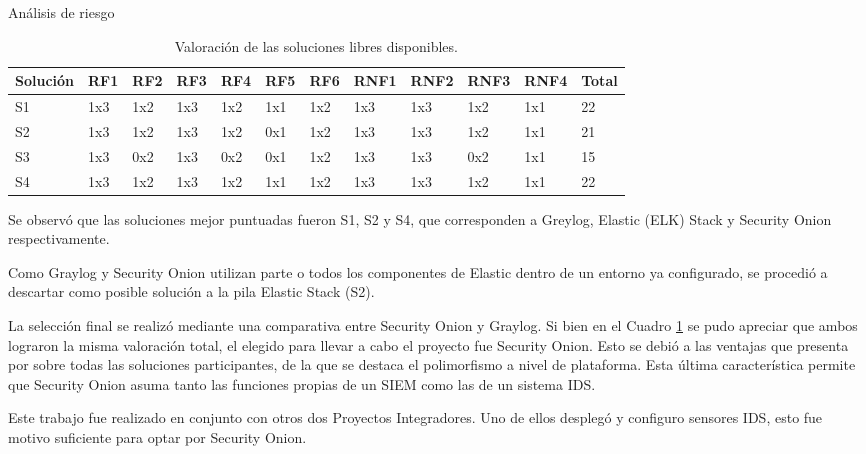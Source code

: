 \begin{section}{Análisis de riesgo}
\begin{table}[H]
\begin{tabular}{|m{4em}|m{2em}|m{2em}|m{2em}|m{2em}|m{2em}|m{2em}|m{3em}|m{3em}|m{3em}|m{3em}| m{2em}|}
            \hline 
                Solución & RF1& RF2& RF3& RF4& RF5& RF6& RNF1& RNF2& RNF3& RNF4 & Total\\ 
            \hline
                S1 & 1x3 & 1x2 & 1x3 & 1x2 & 1x1 & 1x2 & 1x3 & 1x3 & 1x2 & 1x1 & 22\\ 
            \hline
                S2  & 1x3 & 1x2 & 1x3 & 1x2 & 0x1 & 1x2 & 1x3 & 1x3 & 1x2 & 1x1 & 21   \\ 
            \hline
                S3 & 1x3 & 0x2 & 1x3 & 0x2 & 0x1 & 1x2 & 1x3 & 1x3 & 0x2 & 1x1 & 15  \\
            \hline
                S4 & 1x3 & 1x2 & 1x3 & 1x2 & 1x1 & 1x2 & 1x3 & 1x3 & 1x2 & 1x1 & 22 \\
            \hline %
        \end{tabular}
        \caption{Valoración de las soluciones libres disponibles.}
        \label{table:11}
    \end{table} 
    \FloatBarrier
    Se observó que las soluciones mejor puntuadas fueron S1, S2 y S4, que corresponden a Greylog, Elastic (ELK) Stack y Security Onion respectivamente. \par
    Como Graylog y Security Onion utilizan parte o todos los componentes de Elastic dentro de un entorno ya configurado, se procedió a descartar como posible solución a la pila Elastic Stack (S2). \par
    La selección final se realizó mediante una comparativa entre Security Onion y Graylog. Si bien en el Cuadro \ref{table:11} se pudo apreciar que ambos lograron la misma valoración total, el elegido para llevar a cabo el proyecto fue Security Onion. Esto se debió a las ventajas que presenta por sobre todas las soluciones participantes, de la que se destaca el polimorfismo a nivel de plataforma. Esta última característica permite que Security Onion asuma tanto las funciones propias de un SIEM como las de un sistema IDS. \par
    Este trabajo fue realizado en conjunto con otros dos Proyectos Integradores. Uno de ellos desplegó y configuro sensores IDS, esto fue motivo suficiente para optar por Security Onion. \par
    \end{section}
    \pagebreak
